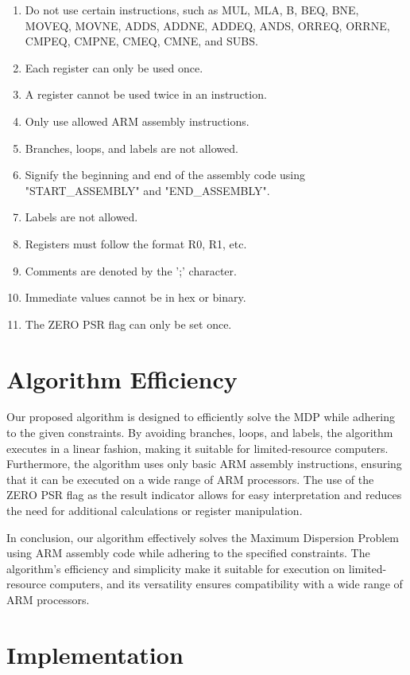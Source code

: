 \begin{enumerate}
    \item Do not use certain instructions, such as MUL, MLA, B, BEQ, BNE, MOVEQ, MOVNE, ADDS, ADDNE, ADDEQ, ANDS, ORREQ, ORRNE, CMPEQ, CMPNE, CMEQ, CMNE, and SUBS.
    \item Each register can only be used once.
    \item A register cannot be used twice in an instruction.
    \item Only use allowed ARM assembly instructions.
    \item Branches, loops, and labels are not allowed.
    \item Signify the beginning and end of the assembly code using "START\_ASSEMBLY" and "END\_ASSEMBLY".
    \item Labels are not allowed.
    \item Registers must follow the format R0, R1, etc.
    \item Comments are denoted by the ';' character.
    \item Immediate values cannot be in hex or binary.
    \item The ZERO PSR flag can only be set once.
\end{enumerate}

\section{Algorithm Efficiency}
Our proposed algorithm is designed to efficiently solve the MDP while adhering to the given constraints. By avoiding branches, loops, and labels, the algorithm executes in a linear fashion, making it suitable for limited-resource computers. Furthermore, the algorithm uses only basic ARM assembly instructions, ensuring that it can be executed on a wide range of ARM processors. The use of the ZERO PSR flag as the result indicator allows for easy interpretation and reduces the need for additional calculations or register manipulation.

In conclusion, our algorithm effectively solves the Maximum Dispersion Problem using ARM assembly code while adhering to the specified constraints. The algorithm's efficiency and simplicity make it suitable for execution on limited-resource computers, and its versatility ensures compatibility with a wide range of ARM processors.



\section{Implementation}

